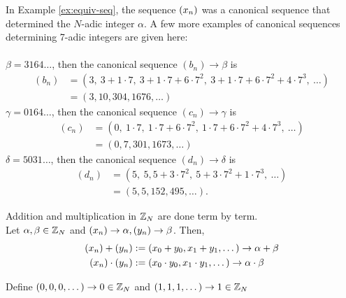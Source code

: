 \begin{example} \label{ex:canon}
  In Example \ref{ex:equiv-seq}, the sequence $(x_n)$ was a canonical
  sequence that determined the $N$-adic integer $\alpha$. A few more examples
  of canonical sequences determining 7-adic integers are given here:\\
  \\
 $\beta = 3164\dots$, then the canonical sequence $(b_n) \rightarrow \beta$ is
  \begin{align*}
    (b_n) &= (3, \ 3+1\cdot7, \ 3+1\cdot7+6\cdot7^2, \ 3+1\cdot7+6\cdot7^2+4\cdot7^3, \ \dots)\\
            &= (3,10,304,1676,\dots)
  \end{align*}
  $\gamma = 0164\dots$, then the canonical sequence $(c_n) \rightarrow \gamma$ is
  \begin{align*}
    (c_n) &= (0, \ 1\cdot7, \ 1\cdot7+6\cdot7^2, \ 1\cdot7+6\cdot7^2+4\cdot7^3, \ \dots)\\
            &= (0,7,301,1673,\dots)
  \end{align*}
  $\delta = 5031\dots$, then the canonical sequence $(d_n) \rightarrow \delta$ is
  \begin{align*}
    (d_n) &= (5, \ 5, 5+3\cdot7^2, \ 5+3\cdot7^2+1\cdot7^3, \ \dots)\\
            &= (5,5,152,495,\dots).
  \end{align*}
\end{example}

\begin{definition}
  Addition and multiplication in $\mathbb{Z}_N$ are done term by term. \\
  Let $\alpha,\beta \in \mathbb{Z}_N$ and $(x_n) \rightarrow \alpha, (y_n) \rightarrow \beta$. Then,
  \begin{align*}
    (x_n)+(y_n)     &:= (x_0+y_0, x_1+y_1, \dots) \rightarrow \alpha+\beta\\
    (x_n)\cdot(y_n) &:= (x_0 \cdot y_0, x_1 \cdot y_1, \dots) \rightarrow \alpha \cdot \beta\\ 
  \end{align*}

  Define $(0,0,0,\dots) \rightarrow 0 \in \mathbb{Z}_N$ and $(1,1,1,\dots) \rightarrow 1 \in \mathbb{Z}_N$
\end{definition}


